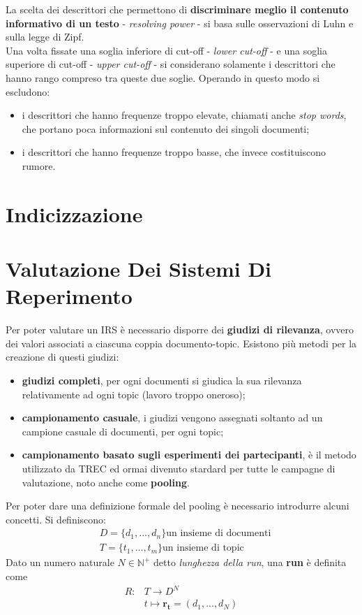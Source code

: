 \documentclass{article}
\begin{document}
La scelta dei descrittori che permettono di \textbf{discriminare meglio il contenuto informativo di un testo} - \textit{resolving power} - si basa sulle osservazioni di Luhn e sulla legge di Zipf.\\
Una volta fissate una soglia inferiore di cut-off - \textit{lower cut-off} - e una soglia superiore di cut-off - \textit{upper cut-off} - si considerano solamente i descrittori che hanno rango compreso tra queste due soglie.
Operando in questo modo si escludono:
\begin{itemize}
\item i descrittori che hanno frequenze troppo elevate, chiamati anche \textit{stop words}, che portano poca informazioni sul contenuto dei singoli documenti;
\item i descrittori che hanno frequenze troppo basse, che invece costituiscono rumore.
\end{itemize}


\section{Indicizzazione}



\section{Valutazione Dei Sistemi Di Reperimento}
Per poter valutare un IRS è necessario disporre dei \textbf{giudizi di rilevanza}, ovvero dei valori associati a ciascuna coppia documento-topic. Esistono più metodi per la creazione di questi giudizi:
\begin{itemize}
\item \textbf{giudizi completi}, per ogni documenti si giudica la sua rilevanza relativamente ad ogni topic (lavoro troppo oneroso);
\item \textbf{campionamento casuale}, i giudizi vengono assegnati soltanto ad un campione casuale di documenti, per ogni topic;
\item \textbf{campionamento basato sugli esperimenti dei partecipanti}, è il metodo utilizzato da TREC ed ormai divenuto stardard per tutte le campagne di valutazione, noto anche come \textbf{pooling}.
\end{itemize}

Per poter dare una definizione formale del pooling è necessario introdurre alcuni concetti. Si definiscono:
\begin{align}
&D = \{d_1, ..., d_n\} \text{un insieme di documenti}\\
&T = \{t_1, ..., t_m\} \text{un insieme di topic}
\end{align}
Dato un numero naturale $N\in\mathbb{N}^+$ detto \textit{lunghezza della run}, una \textbf{run} è definita come
\begin{align}
R: &T \to D^N\\
   &t \mapsto \mathbf{r_t} = (d_1, ..., d_N)
\end{align}
\end{document}
